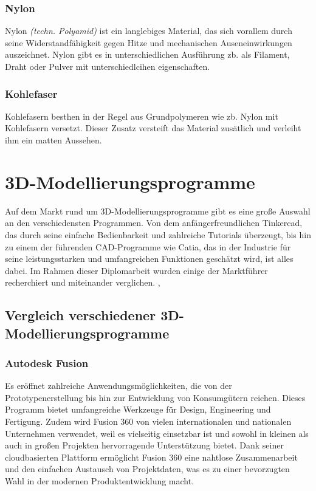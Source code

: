 \subsubsection{Nylon}
Nylon \emph{(techn. Polyamid)} ist ein langlebiges Material, das sich vorallem durch seine Widerstandfähigkeit gegen Hitze und mechanischen Auseneinwirkungen auszeichnet. Nylon gibt es in unterschiedlichen Ausführung zb. als Filament, Draht oder Pulver mit unterschiedlcihen eigenschaften. \cite{Nylon}
\subsubsection{Kohlefaser}
Kohlefasern besthen in der Regel aus Grundpolymeren wie zb. Nylon mit Kohlefasern versetzt. Dieser Zusatz versteift das Material zusätlich und verleiht ihm ein matten Aussehen. \cite{Kohlefasern}

\section{3D-Modellierungsprogramme}
Auf dem Markt rund um 3D-Modellierungsprogramme gibt es eine große Auswahl an den verschiedensten Programmen. Von dem anfängerfreundlichen Tinkercad, das durch seine einfache Bedienbarkeit und zahlreiche Tutorials überzeugt, bis hin zu einem der führenden CAD-Programme wie Catia, das in der Industrie für seine leistungsstarken und umfangreichen Funktionen geschätzt wird, ist alles dabei. Im Rahmen dieser Diplomarbeit wurden einige der Marktführer recherchiert und miteinander verglichen. \cite{CAD-Programme}, \cite{3D-Printing-Software}

\subsection{Vergleich verschiedener 3D-Modellierungsprogramme}

\subsubsection{Autodesk Fusion}
Es eröffnet zahlreiche Anwendungsmöglichkeiten, die von der Prototypenerstellung bis hin zur Entwicklung von Konsumgütern reichen. Dieses Programm bietet umfangreiche Werkzeuge für Design, Engineering und Fertigung. Zudem wird Fusion 360 von vielen internationalen und nationalen Unternehmen verwendet, weil es vielseitig einsetzbar ist und sowohl in kleinen als auch in großen Projekten hervorragende Unterstützung bietet. Dank seiner cloudbasierten Plattform ermöglicht Fusion 360 eine nahtlose Zusammenarbeit und den einfachen Austausch von Projektdaten, was es zu einer bevorzugten Wahl in der modernen Produktentwicklung macht. \cite{AutodeskFusion}

